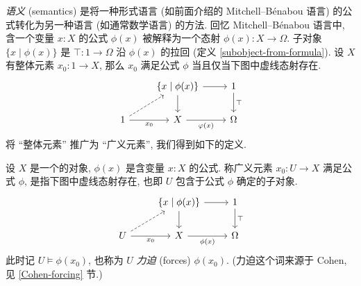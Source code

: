 \emph{语义} (semantics) 是将一种形式语言 (如前面介绍的 Mitchell--B\'enabou 语言) 的公式转化为另一种语言 (如通常数学语言) 的方法. 回忆 Mitchell--B\'enabou 语言中, 含一个变量 $x\colon X$ 的公式 $\phi(x)$ 被解释为一个态射 $\phi(x) \colon X \to \Omega$.
子对象 $\{x \mid \phi(x)\}$ 是 $\top\colon 1\to\Omega$ 沿 $\phi(x)$ 的拉回 (定义 \ref{subobject-from-formula}).
设 $X$ 有整体元素 $x_0\colon 1\to X$, 那么 $x_0$ 满足公式 $\phi$ 当且仅当下图中虚线态射存在.
\[\begin{tikzcd}[ampersand replacement=\&]
	\& {\{x\mid\phi(x)\}} \& 1 \\
	1 \& X \& \Omega
	\arrow[from=1-2, to=2-2]
	\arrow["{x_0}"', from=2-1, to=2-2]
	\arrow["{\varphi(x)}"', from=2-2, to=2-3]
	\arrow[dashed, from=2-1, to=1-2]
	\arrow[from=1-2, to=1-3]
	\arrow["\top", from=1-3, to=2-3]
\end{tikzcd}\]
将 ``整体元素'' 推广为 ``广义元素'', 我们得到如下的定义.

\newcommand{\forces}{\models}

\begin{definition}
	{}
	设 $X$ 是一个\topos{}的对象, $\phi(x)$ 是含变量 $x\colon X$ 的公式. 称广义元素 $x_0 \colon U\to X$ 满足公式 $\phi$, 是指下图中虚线态射存在, 也即 $U$ 包含于公式 $\phi$ 确定的子对象.
	\[\begin{tikzcd}[ampersand replacement=\&]
		\& {\{x\mid\phi(x)\}} \& 1 \\
		U \& X \& \Omega
		\arrow[from=1-2, to=2-2]
		\arrow["{x_0}"', from=2-1, to=2-2]
		\arrow["{\phi(x)}"', from=2-2, to=2-3]
		\arrow[dashed, from=2-1, to=1-2]
		\arrow[from=1-2, to=1-3]
		\arrow["\top", from=1-3, to=2-3]
	\end{tikzcd}\]
	此时记 $U\forces \phi(x_0)$, 也称为 $U$ \emph{力迫} (forces) $\phi(x_0)$. (力迫这个词来源于 Cohen, 见 \ref{Cohen-forcing} 节.)
\end{definition}

